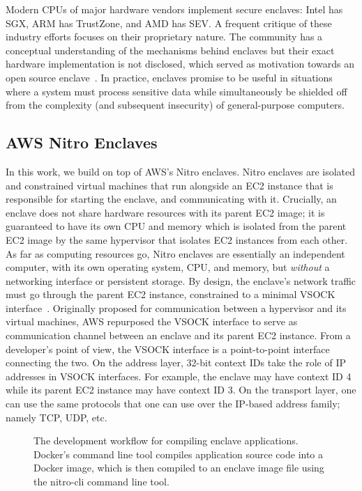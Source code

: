Modern CPUs of major hardware vendors implement secure enclaves: Intel has SGX,
ARM has TrustZone, and AMD has SEV.  A frequent critique of these industry
efforts focuses on their proprietary nature. The community has a conceptual
understanding of the mechanisms behind enclaves but their exact hardware
implementation is not disclosed, which served as motivation towards an open
source enclave~\cite{Lee20a}.  In practice, enclaves promise to be useful in
situations where a system must process sensitive data while simultaneously be
shielded off from the complexity (and subsequent insecurity) of general-purpose
computers.

\subsection{AWS Nitro Enclaves}
\label{sec:nitro}

In this work, we build on top of AWS's Nitro enclaves.  Nitro enclaves are
isolated and constrained virtual machines that run alongside an EC2 instance
that is responsible for starting the enclave, and communicating with it.
Crucially, an enclave does not share hardware resources with its parent EC2
image; it is guaranteed to have its own CPU and memory which is
isolated from the parent EC2 image by the same hypervisor that isolates EC2
instances from each other.
As far as computing resources go, Nitro enclaves are essentially an independent
computer, with its own operating system, CPU, and memory, but \emph{without} a
networking interface or persistent storage.  By design, the enclave's network
traffic must go through the parent EC2 instance, constrained to a minimal VSOCK
interface~\cite{vsock}. Originally proposed for communication between a
hypervisor and its virtual machines, AWS repurposed the VSOCK interface to serve
as communication channel between an enclave and its parent EC2 instance.  From a
developer's point of view, the VSOCK interface is a point-to-point interface
connecting the two.  On the address layer, 32-bit
context IDs take the role of IP addresses in VSOCK interfaces.  For example, the
enclave may have context ID 4 while its parent EC2 instance may have context ID
3.  On the transport layer, one can use the same protocols that one can use over
the IP-based address family; namely TCP, UDP, etc.

\begin{figure}[t]
  \centering
  
  \caption{The development workflow for compiling enclave applications.
  Docker's command line tool compiles application source code into a Docker
  image, which is then compiled to an enclave image file using the nitro-cli
  command line tool.}
  \label{fig:dev-workflow}
\end{figure}

